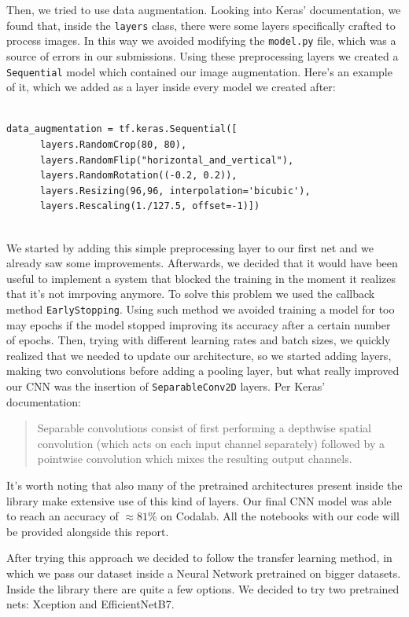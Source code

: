 \documentclass[a4paper,12pt]{article}
\newcommand{\code}[1]{\texttt{#1}}
\numberwithin{equation}{section}
\begin{document}
Then, we tried to use data augmentation. Looking into Keras' documentation, we found that, inside the \code{layers} class, there were some layers specifically crafted to process images. In this way we avoided modifying the \code{model.py} file, which was a source of errors in our submissions. Using these preprocessing layers we created a \code{Sequential} model which contained our image augmentation. Here's an example of it, which we added as a layer inside every model we created after:
\begin{verbatim}
    
data_augmentation = tf.keras.Sequential([
      layers.RandomCrop(80, 80),
      layers.RandomFlip("horizontal_and_vertical"),
      layers.RandomRotation((-0.2, 0.2)),
      layers.Resizing(96,96, interpolation='bicubic'),
      layers.Rescaling(1./127.5, offset=-1)])
  
\end{verbatim}
We started by adding this simple preprocessing layer to our first net and we already saw some improvements. Afterwards, we decided that it would have been useful to implement a system that blocked the training in the moment it realizes that it's not imrpoving anymore. To solve this problem we used the callback method \code{EarlyStopping}. Using such method we avoided training a model for too may epochs if the model stopped improving its accuracy after a certain number of epochs. Then, trying with different learning rates and batch sizes, we quickly realized that we needed to update our architecture, so we started adding layers, making two convolutions before adding a pooling layer, but what really improved our CNN was the insertion of \code{SeparableConv2D} layers. Per Keras' documentation:
\begin{quote}
      Separable convolutions consist of first performing a depthwise spatial convolution (which acts on each input channel separately) followed by a pointwise convolution which mixes the resulting output channels.
\end{quote}
It's worth noting that also many of the pretrained architectures present inside the library make extensive use of this kind of layers. Our final CNN model was able to reach an accuracy of \(\approx 81\%\) on Codalab. All the notebooks with our code will be provided alongside this report.

After trying this approach we decided to follow the transfer learning method, in which we pass our dataset inside a Neural Network pretrained on bigger datasets. Inside the library there are quite a few options. We decided to try two pretrained nets: Xception and EfficientNetB7. 
\end{document}
